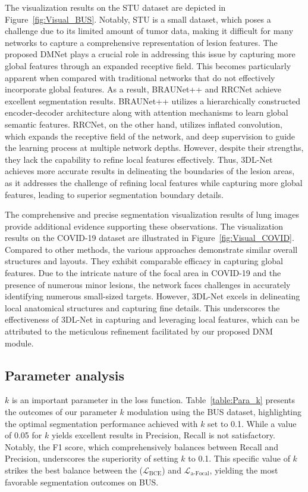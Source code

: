 \documentclass[review]{elsarticle}
\begin{document}
	The visualization results on the STU dataset are depicted in Figure~\ref{fig:Visual_BUS}. Notably, STU is a small dataset, which poses a challenge due to its limited amount of tumor data, making it difficult for many networks to capture a comprehensive representation of lesion features. The proposed DMNet plays a crucial role in addressing this issue by capturing more global features through an expanded receptive field. This becomes particularly apparent when compared with traditional networks that do not effectively incorporate global features. As a result, BRAUNet++ and RRCNet achieve excellent segmentation results. BRAUNet++ utilizes a hierarchically constructed encoder-decoder architecture along with attention mechanisms to learn global semantic features. RRCNet, on the other hand, utilizes inflated convolution, which expands the receptive field of the network, and deep supervision to guide the learning process at multiple network depths. However, despite their strengths, they lack the capability to refine local features effectively. Thus, 3DL-Net achieves more accurate results in delineating the boundaries of the lesion areas, as it addresses the challenge of refining local features while capturing more global features, leading to superior segmentation boundary details.
	
	The comprehensive and precise segmentation visualization results of lung images provide additional evidence supporting these observations. The visualization results on the COVID-19 dataset are illustrated in Figure~\ref{fig:Visual_COVID}. Compared to other methods, the various approaches demonstrate similar overall structures and layouts. They exhibit comparable efficacy in capturing global features. Due to the intricate nature of the focal area in COVID-19 and the presence of numerous minor lesions, the network faces challenges in accurately identifying numerous small-sized targets. However, 3DL-Net excels in delineating local anatomical structures and capturing fine details. This underscores the effectiveness of 3DL-Net in capturing and leveraging local features, which can be attributed to the meticulous refinement facilitated by our proposed DNM module.

	\subsection{Parameter analysis}
	\label{section:lspa}
	$ k $ is an important parameter in the loss function. Table~\ref{table:Para_k} presents the outcomes of our parameter $ k $ modulation using the BUS dataset, highlighting the optimal segmentation performance achieved with $ k $ set to 0.1. While a value of 0.05 for $ k $ yields excellent results in Precision, Recall is not satisfactory. Notably, the F1 score, which comprehensively balances between Recall and Precision, underscores the superiority of setting $ k $ to 0.1. This specific value of $ k $ strikes the best balance between the (\(\mathcal{L}_\text{BCE}\)) and \(\mathcal{L}_\text{a-Focal}\), yielding the most favorable segmentation outcomes on BUS.
\end{document}
